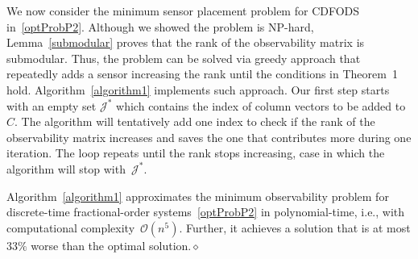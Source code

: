 We now consider the minimum sensor placement problem for CDFODS in~\eqref{optProbP2}. Although we showed the problem is NP-hard,  Lemma~\ref{submodular} proves that the rank of the observability matrix is submodular. Thus, the problem can be solved via greedy approach that repeatedly adds a sensor increasing the rank until the conditions in Theorem~1 hold. Algorithm~\ref{algorithm1} implements such approach. Our first step starts with an empty set $\mathcal J^*$ which contains the index of column vectors to be added to $C$.  The algorithm will tentatively add one index to check if the rank of the observability matrix increases and saves the one that contributes more during one iteration. The loop repeats until the rank stops increasing, case in which the algorithm will stop with~$\mathcal J^*$.
\begin{theorem}
Algorithm~\ref{algorithm1} approximates the minimum observability problem for discrete-time fractional-order systems~\eqref{optProbP2} in polynomial-time, i.e., with computational complexity~$\mathcal O(n^{5})$. Further, it achieves a solution that is at most $33\%$ worse than the optimal solution.\hfill $\diamond$
\label{algorithmApproxResult}
\end{theorem}

